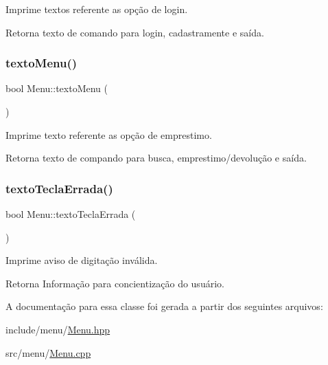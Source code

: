 Imprime textos referente as opção de login. \begin{DoxyReturn}{Retorna}
texto de comando para login, cadastramente e saída. 
\end{DoxyReturn}
\mbox{\label{class_menu_a4e3a778de664787b133df5c670504c63}} 
\subsubsection{\texorpdfstring{textoMenu()}{textoMenu()}}
{\footnotesize\ttfamily bool Menu\+::texto\+Menu (\begin{DoxyParamCaption}{ }\end{DoxyParamCaption})}

Imprime texto referente as opção de emprestimo. \begin{DoxyReturn}{Retorna}
texto de compando para busca, emprestimo/devolução e saída. 
\end{DoxyReturn}
\mbox{\label{class_menu_ad442d6a0f4e151abd649a7279c4cbc41}} 
\subsubsection{\texorpdfstring{textoTeclaErrada()}{textoTeclaErrada()}}
{\footnotesize\ttfamily bool Menu\+::texto\+Tecla\+Errada (\begin{DoxyParamCaption}{ }\end{DoxyParamCaption})}

Imprime aviso de digitação inválida. \begin{DoxyReturn}{Retorna}
Informação para concientização do usuário. 
\end{DoxyReturn}


A documentação para essa classe foi gerada a partir dos seguintes arquivos\+:\begin{DoxyCompactItemize}
\item 
include/menu/\mbox{\hyperlink{_menu_8hpp}{Menu.\+hpp}}\item 
src/menu/\mbox{\hyperlink{_menu_8cpp}{Menu.\+cpp}}\end{DoxyCompactItemize}
